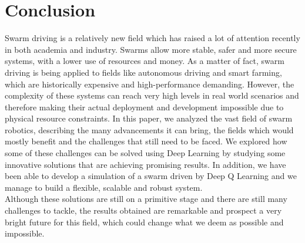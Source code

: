 \documentclass[conference]{IEEEtran}
\begin{document}
\section{Conclusion}
Swarm driving is a relatively new field which has raised a lot of attention recently in both academia and industry. Swarms allow more stable, safer and more secure systems, with a lower use of resources and money. As a matter of fact, swarm driving is being applied to fields like autonomous driving and smart farming, which are historically expensive and high-performance demanding.  
However, the complexity of these systems can reach very high levels in real world scenarios and therefore making their actual deployment and development impossible due to physical resource constraints. 
In this paper, we analyzed the vast field of swarm robotics, describing the many advancements it can bring, the fields which would mostly benefit and the challenges that still need to be faced. We explored how some of these challenges can be solved using Deep Learning by studying some innovative solutions that are achieving promising results. In addition, we have been able to develop a simulation of a swarm driven by Deep Q Learning and we manage to build a flexible, scalable and robust system. \\
Although these solutions are still on a primitive stage and there are still many challenges to tackle, the results obtained are remarkable and prospect a very bright future for this field, which could change what we deem as possible and impossible.\\



\newpage



\end{document}
